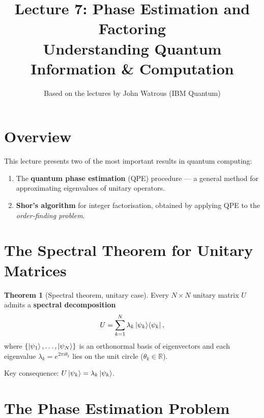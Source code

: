 \documentclass[11pt]{article}
\title{\textbf{Lecture 7: Phase Estimation and Factoring} \\ \large Understanding Quantum Information \& Computation}
\author{Based on the lectures by John Watrous (IBM Quantum)}
\date{}
\theoremstyle{definition}
\newtheorem{theorem}{Theorem}[section]
\begin{document}
\maketitle
\tableofcontents
\newpage

\section{Overview}

This lecture presents two of the most important results in quantum computing:

\begin{enumerate}
    \item The \textbf{quantum phase estimation} (QPE) procedure --- a general method for approximating eigenvalues of unitary operators.
    \item \textbf{Shor's algorithm} for integer factorisation, obtained by applying QPE to the \emph{order-finding problem}.
\end{enumerate}

\section{The Spectral Theorem for Unitary Matrices}

\begin{theorem}[Spectral theorem, unitary case]
Every $N\times N$ unitary matrix $U$ admits a \textbf{spectral decomposition}
\[
    U = \sum_{k=1}^{N}\lambda_k\ket{\psi_k}\!\bra{\psi_k},
\]
where $\{\ket{\psi_1},\dots,\ket{\psi_N}\}$ is an orthonormal basis of eigenvectors and each eigenvalue $\lambda_k = e^{2\pi i\theta_k}$ lies on the unit circle ($\theta_k\in\mathbb{R}$).
\end{theorem}

Key consequence: $U\ket{\psi_k}=\lambda_k\ket{\psi_k}$.

\section{The Phase Estimation Problem}
\end{document}
